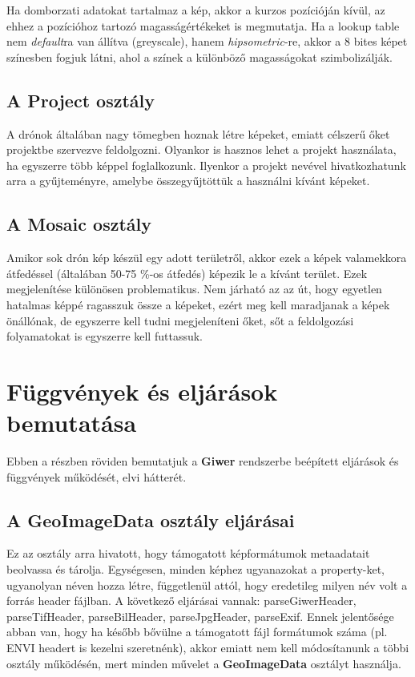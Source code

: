 \documentclass[a4paper,12pt]{article}
\begin{document}
Ha domborzati adatokat tartalmaz a kép, akkor a kurzos pozícióján kívül, az ehhez a pozícióhoz tartozó magasságértékeket is megmutatja. Ha a lookup table nem \textit{default}ra van állítva (greyscale), hanem \textit{hipsometric}-re, akkor a 8 bites képet színesben fogjuk látni, ahol a színek a különböző magasságokat szimbolizálják.


\subsection{A \textbf{Project} osztály}

A drónok általában nagy tömegben hoznak létre képeket, emiatt célszerű őket projektbe szervezve feldolgozni. Olyankor is hasznos lehet a projekt használata, ha egyszerre több képpel foglalkozunk. Ilyenkor a projekt nevével hivatkozhatunk arra a gyűjteményre, amelybe összegyűjtöttük a használni kívánt képeket.

\subsection{A \textbf{Mosaic} osztály}

Amikor sok drón kép készül egy adott területről, akkor ezek a képek valamekkora átfedéssel (általában 50-75 \%-os átfedés) képezik le a kívánt terület. Ezek megjelenítése különösen problematikus. Nem járható az az út, hogy egyetlen hatalmas képpé ragasszuk össze a képeket, ezért meg kell maradjanak a képek önállónak, de egyszerre kell tudni megjeleníteni őket, sőt a feldolgozási folyamatokat is egyszerre kell futtassuk. 



\section{Függvények és eljárások bemutatása}

Ebben a részben röviden bemutatjuk a \textbf{Giwer} rendszerbe beépített eljárások és függvények működését, elvi hátterét.

\subsection{A \textbf{GeoImageData} osztály eljárásai}

Ez az osztály arra hivatott, hogy támogatott képformátumok metaadatait beolvassa és tárolja. Egységesen, minden képhez ugyanazokat a property-ket, ugyanolyan néven  hozza létre, függetlenül attól, hogy eredetileg milyen név volt a forrás header fájlban. A következő eljárásai vannak: parseGiwerHeader, parseTifHeader, parseBilHeader, parseJpgHeader, parseExif. Ennek jelentősége abban van, hogy ha később bővülne a támogatott fájl formátumok száma (pl. ENVI headert is kezelni szeretnénk), akkor emiatt nem kell módosítanunk a többi osztály működésén, mert minden művelet a \textbf{GeoImageData} osztályt használja.
\end{document}
